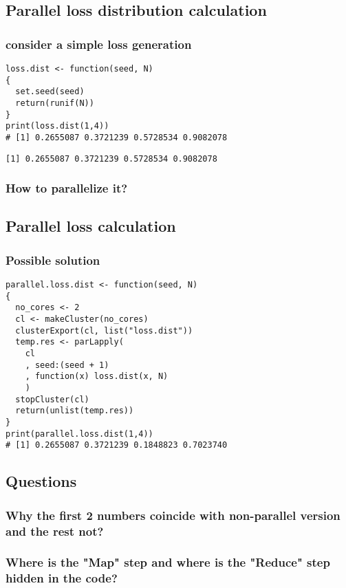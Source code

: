\documentclass[bigger]{beamer}
\begin{document}
\subsection{Parallel loss distribution calculation}
\label{sec-3-13}
\subsubsection{consider a simple loss generation}
\label{sec-3-13-1}
\begin{verbatim}
loss.dist <- function(seed, N)
{
  set.seed(seed)
  return(runif(N))
}
print(loss.dist(1,4))
# [1] 0.2655087 0.3721239 0.5728534 0.9082078
\end{verbatim}

\begin{verbatim}
[1] 0.2655087 0.3721239 0.5728534 0.9082078
\end{verbatim}

\subsubsection{How to parallelize it?}
\label{sec-3-13-2}
\subsection{Parallel loss calculation}
\label{sec-3-14}
\subsubsection{Possible solution}
\label{sec-3-14-1}
\begin{verbatim}
parallel.loss.dist <- function(seed, N)
{
  no_cores <- 2
  cl <- makeCluster(no_cores)
  clusterExport(cl, list("loss.dist"))
  temp.res <- parLapply(
	cl
	, seed:(seed + 1)
	, function(x) loss.dist(x, N)
	)
  stopCluster(cl)
  return(unlist(temp.res))
}
print(parallel.loss.dist(1,4))
# [1] 0.2655087 0.3721239 0.1848823 0.7023740
\end{verbatim}

\subsection{Questions}
\label{sec-3-15}
\subsubsection{Why the first 2 numbers coincide with non-parallel version and the rest not?}
\label{sec-3-15-1}
\subsubsection{Where is the "Map" step and where is the "Reduce" step hidden in the code?}
\label{sec-3-15-2}
\end{document}
